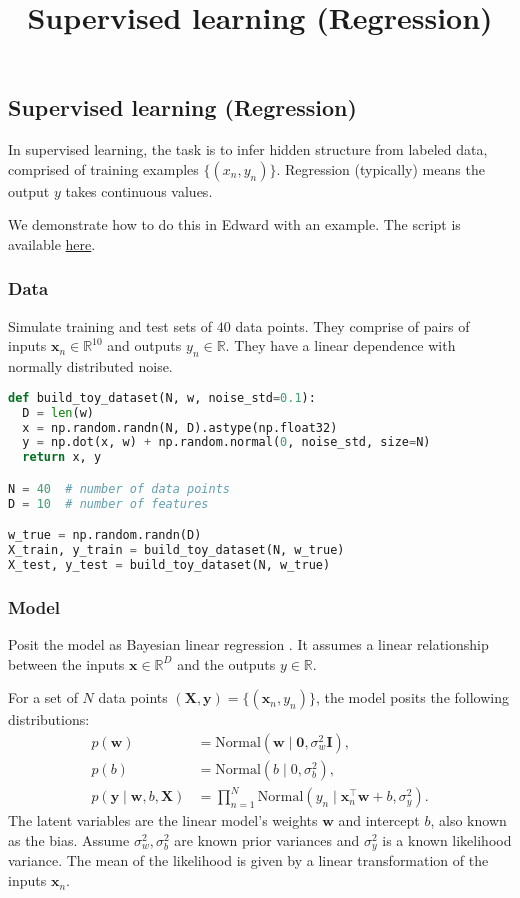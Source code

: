 \title{Supervised learning (Regression)}

\subsection{Supervised learning (Regression)}

In supervised learning, the task is to infer hidden structure from
labeled data, comprised of training examples $\{(x_n, y_n)\}$.
Regression (typically) means the output $y$ takes continuous values.

We demonstrate how to do this in Edward with an example.
The script is available
\href{https://github.com/blei-lab/edward/blob/master/examples/bayesian_linear_regression.py}
{here}.


\subsubsection{Data}

Simulate training and test sets of $40$ data points. They comprise of
pairs of inputs $\mathbf{x}_n\in\mathbb{R}^{10}$ and outputs
$y_n\in\mathbb{R}$. They have a linear dependence with normally
distributed noise.

\begin{lstlisting}[language=Python]
def build_toy_dataset(N, w, noise_std=0.1):
  D = len(w)
  x = np.random.randn(N, D).astype(np.float32)
  y = np.dot(x, w) + np.random.normal(0, noise_std, size=N)
  return x, y

N = 40  # number of data points
D = 10  # number of features

w_true = np.random.randn(D)
X_train, y_train = build_toy_dataset(N, w_true)
X_test, y_test = build_toy_dataset(N, w_true)
\end{lstlisting}


\subsubsection{Model}

Posit the model as Bayesian linear regression \citep{murphy2012machine}.
It assumes a linear relationship between the inputs
$\mathbf{x}\in\mathbb{R}^D$ and the outputs $y\in\mathbb{R}$.

For a set of $N$ data points $(\mathbf{X},\mathbf{y})=\{(\mathbf{x}_n, y_n)\}$,
the model posits the following distributions:
\begin{align*}
  p(\mathbf{w})
  &=
  \text{Normal}(\mathbf{w} \mid \mathbf{0}, \sigma_w^2\mathbf{I}),
  \\[1.5ex]
  p(b)
  &=
  \text{Normal}(b \mid 0, \sigma_b^2),
  \\
  p(\mathbf{y} \mid \mathbf{w}, b, \mathbf{X})
  &=
  \prod_{n=1}^N
  \text{Normal}(y_n \mid \mathbf{x}_n^\top\mathbf{w} + b, \sigma_y^2).
\end{align*}
The latent variables are the linear model's weights $\mathbf{w}$ and
intercept $b$, also known as the bias.
Assume $\sigma_w^2,\sigma_b^2$ are known prior variances and $\sigma_y^2$ is a
known likelihood variance. The mean of the likelihood is given by a
linear transformation of the inputs $\mathbf{x}_n$.

